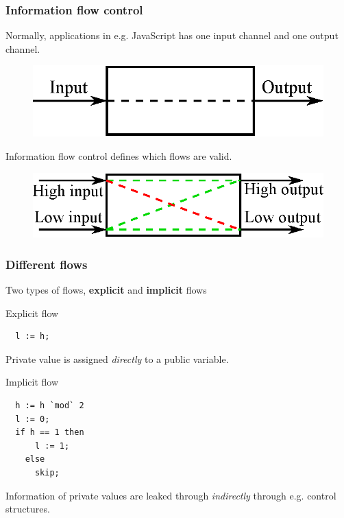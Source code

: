 \documentclass{beamer}
\begin{document}


\begin{frame}
  \frametitle{Information flow control}
  Normally, applications in e.g. JavaScript has one input channel and one output channel.
  \begin{figure}[h]
    \includegraphics[scale=0.65]{images/flow_normal.eps}
  \end{figure}
  \pause
  Information flow control defines which flows are valid.
  \begin{figure}[h]
    \includegraphics[scale=0.65]{images/flow_controlled.eps}
  \end{figure}
\end{frame}


\begin{frame}[fragile]
  \frametitle{Different flows}
  Two types of flows, \textbf{explicit} and \textbf{implicit} flows \pause
  \newline
  \begin{block}{Explicit flow}
\begin{verbatim}
  l := h;
\end{verbatim}
  \end{block}
  Private value is assigned \emph{directly} to a public variable.
  \pause
  \begin{block}{Implicit flow}
\begin{verbatim}
  h := h `mod` 2
  l := 0;
  if h == 1 then
      l := 1;
    else
      skip;
\end{verbatim}
  \end{block}
  Information of private values are leaked through \emph{indirectly} through e.g. control structures.
\end{frame}
\end{document}
